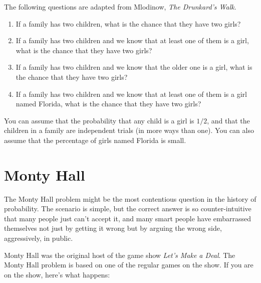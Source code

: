 \documentclass[12pt]{book}
\begin{document}
\begin{ex}

The following questions are adapted from Mlodinow, {\em The Drunkard's
  Walk}.

\begin{enumerate}

\item If a family has two children, what is the chance that they
  have two girls?

\item If a family has two children and we know that at least one of
  them is a girl, what is the chance that they have two girls?

\item If a family has two children and we know that the older one is a
  girl, what is the chance that they have two girls?

\item If a family has two children and we know that at least one of
  them is a girl named Florida, what is the chance that they have
  two girls?

\end{enumerate}

You can assume that the probability that any child is a girl is $1/2$,
and that the children in a family are independent trials (in more ways
than one).  You can also assume that the percentage of girls named
Florida is small.

\end{ex}


\section{Monty Hall}

The Monty Hall problem might be the most contentious question in
the history of probability.  The scenario is simple, but the correct
answer is so counter-intuitive that many people just can't accept
it, and many smart people have embarrassed themselves not just by
getting it wrong but by arguing the wrong side, aggressively,
in public.

Monty Hall was the original host of the game show {\em Let's Make a
Deal}.  The Monty Hall problem is based on one of the regular
games on the show.  If you are on the show, here's what happens:
\end{document}
